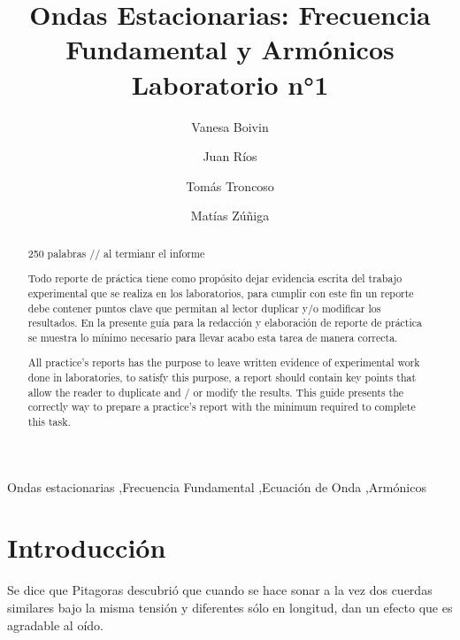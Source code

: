 \documentclass[times,5p, twocolumn]{elsarticle}
\begin{document}
\begin{frontmatter}
\title{Ondas Estacionarias: Frecuencia Fundamental y Armónicos\\ Laboratorio n°1}

\author{Vanesa Boivin}


\author{Juan Ríos}

\author{Tomás Troncoso}

\author{Matías Zúñiga}


\address{Instituto de Física, PUCV}

\begin{abstract}
250 palabras // al termianr el informe

Todo reporte de práctica tiene como propósito dejar evidencia escrita del trabajo experimental que se realiza en los laboratorios, para cumplir con este fin un reporte debe contener puntos clave que permitan al lector duplicar y/o modificar los  resultados. En la presente guía para la redacción y elaboración de reporte de práctica se muestra lo mínimo necesario para llevar acabo esta tarea de manera correcta.

All practice's reports has the purpose to leave written evidence of experimental work done in laboratories, to satisfy this purpose, a report should contain key points that allow the reader to duplicate and / or modify the results. This guide presents the correctly way to prepare a practice's report with the minimum required to complete this task. 

\end{abstract}
\begin{keyword}
Ondas estacionarias \sep Frecuencia Fundamental \sep Ecuación de Onda \sep Armónicos
\end{keyword}
\end{frontmatter}

\section{Introducción}

Se dice que Pitagoras descubrió que cuando se hace sonar a la vez dos cuerdas similares bajo la misma tensión y diferentes sólo en longitud, dan un efecto que es agradable al oído. 
\end{document}

